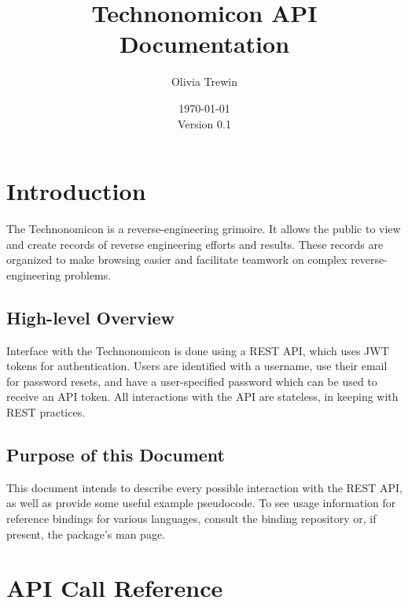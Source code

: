 \documentclass[12pt]{article}
\title{Technonomicon API Documentation}
\author{Olivia Trewin}
\date{\today\\ \normalsize Version 0.1}
\begin{document}
    \maketitle

    \section{Introduction}
        The Technonomicon is a reverse-engineering grimoire.
        It allows the public to view and create records of reverse engineering efforts and results.
        These records are organized to make browsing easier and facilitate teamwork on complex reverse-engineering problems.

        \subsection{High-level Overview}
            Interface with the Technonomicon is done using a REST API, which uses JWT tokens for authentication.
            Users are identified with a username, use their email for password resets, and have a user-specified password which can be used to receive an API token.
            All interactions with the API are stateless, in keeping with REST practices.
        
        \subsection{Purpose of this Document}
            This document intends to describe every possible interaction with the REST API, as well as provide some useful example pseudocode.
            To see usage information for reference bindings for various languages, consult the binding repository or, if present, the package's man page.

    \section{API Call Reference}
\end{document}
